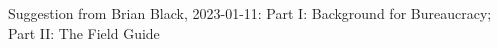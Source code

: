 Suggestion from Brian Black, 2023-01-11:
Part I: Background for Bureaucracy; Part II: The Field Guide